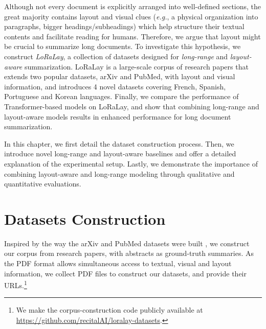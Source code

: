 Although not every document is explicitly arranged into well-defined sections, the great majority contains layout and visual clues (\textit{e.g.}, a physical organization into paragraphs, bigger headings/subheadings) which help structure their textual contents and facilitate reading for humans. Therefore, we argue that layout might be crucial to summarize long documents. To investigate this hypothesis, we construct \emph{LoRaLay}, a collection of datasets designed for \textit{long-range} and \textit{layout-aware} summarization. LoRaLay is a large-scale corpus of research papers that extends two popular datasets, arXiv and PubMed, with layout and visual information, and introduces 4 novel datasets covering French, Spanish, Portuguese and Korean languages. Finally, we compare the performance of Transformer-based models on LoRaLay, and show that combining long-range and layout-aware models results in enhanced performance for long document summarization.

In this chapter, we first detail the dataset construction process. Then, we introduce novel long-range and layout-aware baselines and offer a detailed explanation of the experimental setup. Lastly, we demonstrate the importance of combining layout-aware and long-range modeling through qualitative and quantitative evaluations.

\section{Datasets Construction}

Inspired by the way the arXiv and PubMed datasets were built \citep{cohan2018discourse}, we construct our corpus from research papers, with abstracts as ground-truth summaries. As the PDF format allows simultaneous access to textual, visual and layout information, we collect PDF files to construct our datasets, and provide their URLs.\footnote{We make the corpus-construction code publicly available at \url{https://github.com/recitalAI/loralay-datasets}.}

